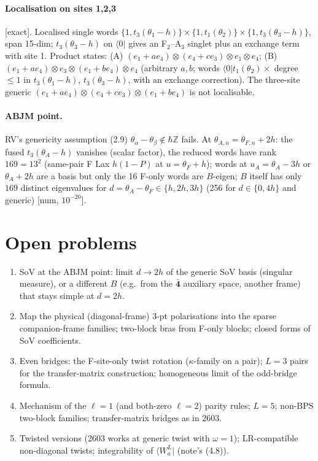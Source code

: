 \documentclass[11pt]{article}
\newcommand{\ex}{\textsf{[exact]}}
\newcommand{\num}[1]{\textsf{[num, $#1$]}}
\newcommand{\bra}[1]{\langle#1|}
\begin{document}
\paragraph{Localisation on sites 1,2,3} \ex. Localised single words $\{1,t_3(\theta_1-h)\}\times\{1,t_1(\theta_2)\}\times\{1,t_3(\theta_3-h)\}$,
span 15-dim; $t_3(\theta_3-h)$ on $\bra0$ gives an F$_2$--A$_3$ singlet plus an exchange term with site 1. Product states:
(A) $(e_1+ae_4)\otimes(e_4+ce_3)\otimes e_1\otimes e_4$; (B) $(e_1+ae_4)\otimes e_3\otimes(e_1+be_4)\otimes e_4$ (arbitrary $a,b$; words
$\bra0t_1(\theta_2)\times$ degree $\le1$ in $t_3(\theta_1-h)$, $t_3(\theta_3-h)$, with an exchange correction). The three-site
generic $(e_1+ae_4)\otimes(e_4+ce_3)\otimes(e_1+be_4)$ is not localisable.

\paragraph{ABJM point.} RV's genericity assumption (2.9) $\theta_\alpha-\theta_\beta\notin\hbar\mathbb Z$ fails. At
$\theta_{A,n}=\theta_{F,n}+2h$: the fused $t_3(\theta_A-h)$ vanishes (scalar factor), the reduced words have rank
$169=13^2$ (same-pair F Lax $h(1-P)$ at $u=\theta_F+h$); words at $u_A=\theta_A-3h$ or $\theta_A+2h$ are a basis but only the
16 F-only words are $B$-eigen; $B$ itself has only $169$ distinct eigenvalues for $d=\theta_A-\theta_F\in\{h,2h,3h\}$ (256
for $d\in\{0,4h\}$ and generic) \num{10^{-20}}.

\section{Open problems}\label{sec:open}
\begin{enumerate}
\item SoV at the ABJM point: limit $d\to2h$ of the generic SoV basis (singular measure), or a different $B$ (e.g.\ from the
$\bar{\mathbf4}$ auxiliary space, another frame) that stays simple at $d=2h$.
\item Map the physical (diagonal-frame) 3-pt polarisations into the sparse companion-frame families; two-block bras from
F-only blocks; closed forms of SoV coefficients.
\item Even bridges: the F-site-only twist rotation ($\kappa$-family on a pair); $L=3$ pairs for the transfer-matrix
construction; homogeneous limit of the odd-bridge formula.
\item Mechanism of the $\ell=1$ (and both-zero $\ell=2$) parity rules; $L=5$; non-BPS two-block families; transfer-matrix
bridges as in 2603.
\item Twisted versions (2603 works at generic twist with $\omega=1$); LR-compatible non-diagonal twists; integrability of
$\bra{W_a^L}$ (note's (4.8)).
\end{enumerate}
\end{document}
